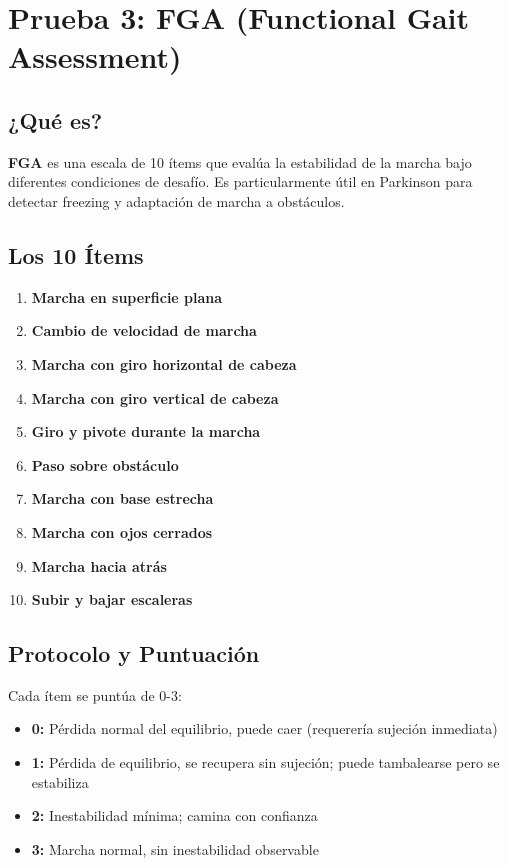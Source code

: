 \documentclass[12pt,a4paper,spanish,oneside]{book}
\begin{document}
\section{Prueba 3: FGA (Functional Gait Assessment)}

\subsection{¿Qué es?}

\textbf{FGA} es una escala de 10 ítems que evalúa la estabilidad de la marcha bajo diferentes condiciones de desafío. Es particularmente útil en Parkinson para detectar freezing y adaptación de marcha a obstáculos.

\subsection{Los 10 Ítems}

\begin{enumerate}
  \item \textbf{Marcha en superficie plana}
  \item \textbf{Cambio de velocidad de marcha}
  \item \textbf{Marcha con giro horizontal de cabeza}
  \item \textbf{Marcha con giro vertical de cabeza}
  \item \textbf{Giro y pivote durante la marcha}
  \item \textbf{Paso sobre obstáculo}
  \item \textbf{Marcha con base estrecha}
  \item \textbf{Marcha con ojos cerrados}
  \item \textbf{Marcha hacia atrás}
  \item \textbf{Subir y bajar escaleras}
\end{enumerate}

\subsection{Protocolo y Puntuación}

Cada ítem se puntúa de 0-3:

\begin{itemize}
  \item \textbf{0:} Pérdida normal del equilibrio, puede caer (requerería sujeción inmediata)
  \item \textbf{1:} Pérdida de equilibrio, se recupera sin sujeción; puede tambalearse pero se estabiliza
  \item \textbf{2:} Inestabilidad mínima; camina con confianza
  \item \textbf{3:} Marcha normal, sin inestabilidad observable
\end{itemize}
\end{document}
